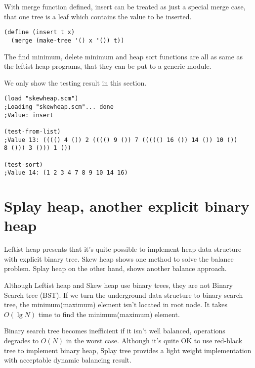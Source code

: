 \documentclass{article}
\begin{document}
With merge function defined, insert can be treated as just a special
merge case, that one tree is a leaf which contains the value to be
inserted.

\begin{lstlisting}
(define (insert t x)
  (merge (make-tree '() x '()) t))
\end{lstlisting}

The find minimum, delete minimum and heap sort functions are all
as same as the leftist heap programs, that they can be put to
a generic module.

We only show the testing result in this section.

\begin{lstlisting}
(load "skewheap.scm")
;Loading "skewheap.scm"... done
;Value: insert

(test-from-list)
;Value 13: (((() 4 ()) 2 (((() 9 ()) 7 ((((() 16 ()) 14 ()) 10 ())
8 ())) 3 ())) 1 ())

(test-sort)
;Value 14: (1 2 3 4 7 8 9 10 14 16)
\end{lstlisting}


\section{Splay heap, another explicit binary heap}
\label{splayheap}

Leftist heap presents that it's quite possible to implement
heap data structure with explicit binary tree. Skew heap
shows one method to solve the balance problem. Splay heap
on the other hand, shows another balance approach.

Although Leftist heap and Skew heap use binary trees, they
are not Binary Search tree (BST). If we turn the underground
data structure to binary search tree, the minimum(maximum)
element isn't located in root node. It takes $O(\lg N)$ time
to find the minimum(maximum) element.

Binary search tree becomes inefficient if it isn't well
balanced, operations degrades to $O(N)$ in the worst case.
Although it's quite OK to use red-black tree to implement
binary heap, Splay tree provides a light weight implementation
with acceptable dynamic balancing result.

\end{document}
